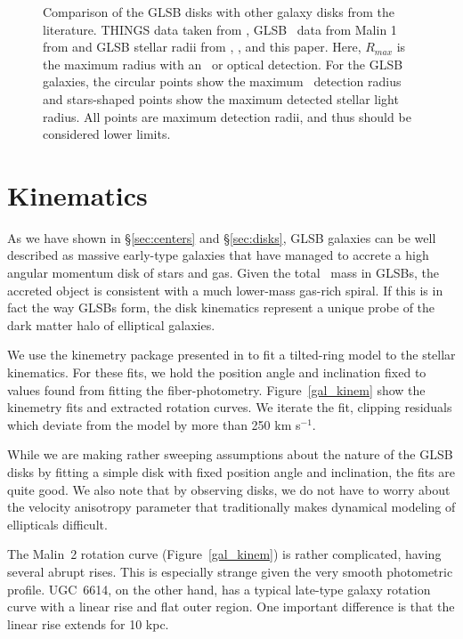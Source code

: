 \documentclass[12pt,preprint]{aastex}
\newcommand\kms{km s$^{-1}$}
\newcommand\HI{\ion{H}{1}}
\begin{document}
\begin{figure*}
\caption{ Comparison of the GLSB disks with other galaxy disks from the literature.
THINGS data taken from \citet{DeBlok2008}, GLSB \HI\ data from Malin 1 from \citet{Pickering97} and GLSB stellar radii from \citet{Galaz15}, \citet{Kasparova14}, and this paper.
Here, $R_{max}$ is the maximum radius with an \HI\ or optical detection.
For the GLSB galaxies, the circular points show the maximum \HI\ detection radius and stars-shaped points show the maximum detected stellar light radius.
All points are maximum detection radii, and thus should be considered lower limits.
 \label{disk_comp}}
\end{figure*}


\section{Kinematics}\label{sec:kinematics}

As we have shown in \S\ref{sec:centers} and \S\ref{sec:disks}, GLSB galaxies can be well described as massive early-type galaxies that have managed to accrete a high angular momentum disk of stars and gas.
Given the total \HI\ mass in GLSBs, the accreted object is consistent with a much lower-mass gas-rich spiral.
If this is in fact the way GLSBs form, the disk kinematics represent a unique probe of the dark matter halo of elliptical galaxies.

We use the kinemetry package presented in \citet{Krajn06} to fit a tilted-ring model to the stellar kinematics.
For these fits, we hold the position angle and inclination fixed to values found from fitting the fiber-photometry.
Figure~\ref{gal_kinem} show the kinemetry fits and extracted rotation curves.
We iterate the fit, clipping residuals which deviate from the model by more than 250 \kms.


While we are making rather sweeping assumptions about the nature of the GLSB disks by fitting a simple disk with fixed position angle and inclination, the fits are quite good.
We also note that by observing disks, we do not have to worry about the velocity anisotropy parameter that traditionally makes dynamical modeling of ellipticals difficult.

The Malin~2 rotation curve (Figure~\ref{gal_kinem}) is rather complicated, having several abrupt rises.
This is especially strange given the very smooth photometric profile.
UGC~6614, on the other hand, has a typical late-type galaxy rotation curve with a linear rise and flat outer region.
One important difference is that the linear rise extends for 10 kpc.
\end{document}
